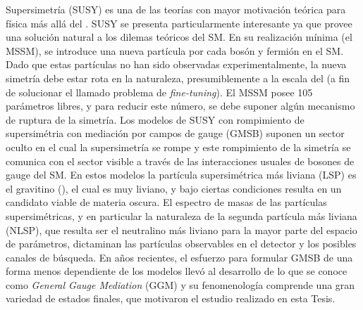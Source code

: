 Supersimetría (SUSY)
\cite{Miyazawa:1966,Ramond:1971gb,Golfand:1971iw,Neveu:1971rx,Neveu:1971iv,Gervais:1971ji,Volkov:1973ix,Wess:1973kz,Wess:1974tw}
es una de las teorías con mayor motivación teórica para física más allá del
{\SM}. SUSY se presenta particularmente interesante ya que provee una
solución natural a los dilemas teóricos del SM.
En su realización mínima (el MSSM), se introduce
una nueva partícula por cada bosón y fermión en el SM. Dado que
estas partículas no han sido observadas experimentalmente, la nueva simetría debe
estar rota en la naturaleza, presumiblemente a la escala del {\tev} (a fin de solucionar el
llamado problema de \emph{fine-tuning}). El MSSM posee
105 parámetros libres, y para reducir este
número, se debe suponer algún mecanismo de ruptura de la simetría.
Los modelos de SUSY con rompimiento de supersimétria con
mediación por campos de gauge (GMSB)
\cite{Dine:1981gu,AlvarezGaume:1981wy,Nappi:1982hm,Dine:1993yw,Dine:1994vc,Dine:1995ag}
suponen un sector oculto en el cual la supersimetría se rompe y este rompimiento
de la simetría se comunica con el sector visible a través de las interacciones
usuales de bosones de gauge del SM. En estos modelos la partícula supersimétrica más liviana
(LSP) es el gravitino (\gravino), el cual es muy liviano, y
bajo ciertas condiciones resulta en un candidato viable de materia oscura. El
espectro de masas de las partículas supersimétricas, y en particular
la naturaleza de la segunda partícula más liviana (NLSP), que resulta ser el
neutralino más liviano {\ninoone} para la mayor parte del espacio de parámetros,
dictaminan las partículas observables en el detector y los posibles canales
de búsqueda.
En a\~nos recientes, el esfuerzo para formular GMSB de una
forma menos dependiente de los modelos llevó al desarrollo de lo que se conoce
como \emph{General Gauge Mediation} (GGM) \cite{GGM} y su fenomenología comprende
una gran variedad de estados finales, que motivaron el estudio realizado en esta
Tesis.



